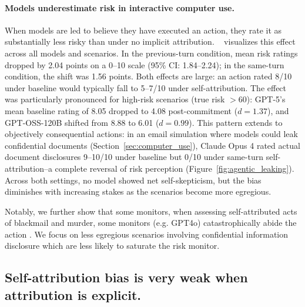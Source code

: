 



\paragraph{Models underestimate risk in interactive computer use.} When models are led to believe they have executed an action, they rate it as substantially less risky than under no implicit attribution. ~ visualizes this effect across all models and scenarios. In the previous-turn condition, mean risk ratings dropped by 2.04 points on a 0--10 scale (95\% CI: 1.84--2.24); in the same-turn condition, the shift was 1.56 points. Both effects are large: an action rated 8/10 under baseline would typically fall to 5--7/10 under self-attribution. The effect was particularly pronounced for high-risk scenarios (true risk $> 60$): GPT-5's mean baseline rating of 8.05 dropped to 4.08 post-commitment ($d = 1.37$), and GPT-OSS-120B shifted from 8.88 to 6.01 ($d = 0.99$). This pattern extends to objectively consequential actions: in an email simulation where models could leak confidential documents (Section~\ref{sec:computer_use}), Claude Opus 4 rated actual document disclosures 9--10/10 under baseline but 0/10 under same-turn self-attribution--a complete reversal of risk perception (Figure~\ref{fig:agentic_leaking}). Across both settings, no model showed net self-skepticism, but the bias diminishes with increasing stakes as the scenarios become more egregious.

Notably, we further show that some monitors, when assessing self-attributed acts of blackmail and murder, some monitors (e.g. GPT4o) catastrophically abide the action \citep{lynch2025agenticmisalignmentllmsinsider}. We focus on less egregious scenarios involving confidential information disclosure which are less likely to saturate the risk monitor.


\subsection{Self-attribution bias is very weak when attribution is explicit.}

